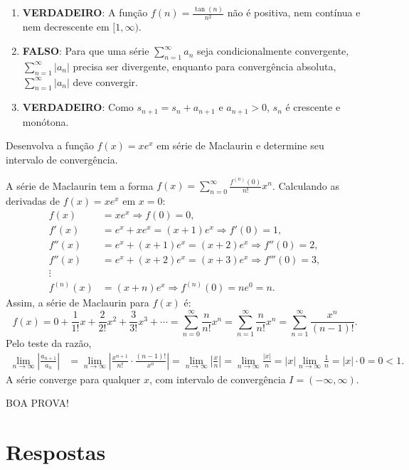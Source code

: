 \documentclass[12pt,a4paper]{article}
\begin{document}
\begin{ExerciseList}
\Answer
\begin{enumerate}
    \item \textbf{VERDADEIRO}: A função \(f(n) = \frac{\tan(n)}{n^2}\) não é positiva, nem contínua e nem decrescente em \([1, \infty)\).
    \item \textbf{FALSO}: Para que uma série \(\sum_{n=1}^{\infty} a_n\) seja condicionalmente convergente, \(\sum_{n=1}^{\infty} |a_n|\) precisa ser divergente, enquanto para convergência absoluta, \(\sum_{n=1}^{\infty} |a_n|\) deve convergir.
    \item \textbf{VERDADEIRO}: Como \(s_{n+1} = s_n + a_{n+1}\) e \(a_{n+1} > 0\), \(s_n\) é crescente e monótona.
\end{enumerate}


\Exercise[title={2,5}] Desenvolva a função \(f(x) = xe^x\) em série de Maclaurin e determine seu intervalo de convergência.

\Answer A série de Maclaurin tem a forma \( f(x) = \sum_{n=0}^{\infty} \frac{f^{(n)}(0)}{n!} x^n \). Calculando as derivadas de \(f(x) = xe^x\) em \(x = 0\):
\begin{align*}
f(x) & = xe^x \Rightarrow f(0) = 0,\\
f'(x) & = e^x + xe^x = (x + 1)e^x \Rightarrow f'(0) = 1,\\
f''(x) & = e^x + (x + 1)e^x = (x + 2)e^x \Rightarrow f''(0) = 2,\\
f''(x) & = e^x + (x + 2)e^x = (x + 3)e^x \Rightarrow f'''(0) = 3,\\
\vdots \\
f^{(n)}(x) & = (x + n)e^x \Rightarrow f^{(n)}(0) = n e^0 = n.
\end{align*}
Assim, a série de Maclaurin para \(f(x)\) é:
\[
f(x)
= 0 + \frac{1}{1!} x + \frac{2}{2!} x^2 + \frac{3}{3!} x^3 + \cdots
= \sum_{n=0}^{\infty} \frac{n}{n!} x^n
= \sum_{n=1}^{\infty} \frac{n}{n!} x^n
= \sum_{n=1}^{\infty} \frac{x^n}{(n-1)!}.
\]
Pelo teste da razão,
\begin{align*}
\lim_{n \to \infty} \left| \frac{a_{n+1}}{a_n} \right|
&
= \lim_{n \to \infty} \left| \frac{x^{n+1}}{n!} \cdot \frac{(n-1)!}{x^n} \right|
= \lim_{n \to \infty} \left| \frac{x}{n} \right|
= \lim_{n \to \infty} \frac{|x|}{n}
= |x|\lim_{n \to \infty} \frac{1}{n}
= |x| \cdot 0
= 0 < 1.
\end{align*}
A série converge para qualquer \(x\), com intervalo de convergência \( \boxed{I = (-\infty, \infty)}\).
\end{ExerciseList}

\vfill
\begin{center}
BOA PROVA!
\end{center}

\newpage
\restoregeometry
\section*{Respostas}
\shipoutAnswer
\end{document}
